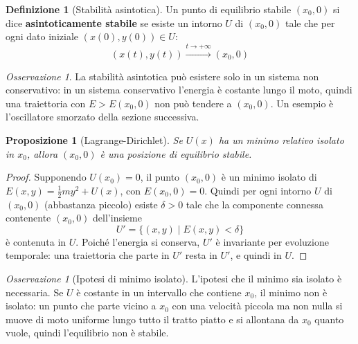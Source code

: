 \documentclass[11pt, a4paper, openright]{book}
\theoremstyle{plain}
\newtheorem{proposizione}[teorema]{Proposizione}
\theoremstyle{definition}
\newtheorem{definizione}[teorema]{Definizione}
\theoremstyle{remark}
\newtheorem{osservazione}[teorema]{Osservazione}
\begin{document}
\begin{definizione}[Stabilità asintotica]
    Un punto di equilibrio stabile $(x_0, 0)$ si dice \textbf{asintoticamente stabile} se esiste un intorno $U$ di $(x_0, 0)$ tale che per ogni dato iniziale $(x(0), y(0)) \in U$:
    \begin{equation}
        (x(t), y(t)) \xrightarrow{t \to +\infty} (x_0, 0)
    \end{equation}
\end{definizione}

\begin{osservazione}
    La stabilità asintotica può esistere solo in un sistema non conservativo: in un sistema conservativo l'energia è costante lungo il moto, quindi una traiettoria con $E > E(x_0, 0)$ non può tendere a $(x_0, 0)$. Un esempio è l'oscillatore smorzato della sezione successiva.
\end{osservazione}

\begin{proposizione}[Lagrange-Dirichlet]
    Se $U(x)$ ha un minimo relativo isolato in $x_0$, allora $(x_0, 0)$ è una posizione di equilibrio stabile.
\end{proposizione}
\begin{proof}
    Supponendo $U(x_0) = 0$, il punto $(x_0, 0)$ è un minimo isolato di $E(x, y) = \frac{1}{2}m y^2 + U(x)$, con $E(x_0, 0) = 0$. Quindi per ogni intorno $U$ di $(x_0, 0)$ (abbastanza piccolo) esiste $\delta > 0$ tale che la componente connessa contenente $(x_0, 0)$ dell'insieme
    \begin{equation}
        U' = \{(x, y) \mid E(x, y) < \delta\}
    \end{equation}
    è contenuta in $U$. Poiché l'energia si conserva, $U'$ è invariante per evoluzione temporale: una traiettoria che parte in $U'$ resta in $U'$, e quindi in $U$.
\end{proof}

\begin{osservazione}[Ipotesi di minimo isolato]
    L'ipotesi che il minimo sia isolato è necessaria. Se $U$ è costante in un intervallo che contiene $x_0$, il minimo non è isolato: un punto che parte vicino a $x_0$ con una velocità piccola ma non nulla si muove di moto uniforme lungo tutto il tratto piatto e si allontana da $x_0$ quanto vuole, quindi l'equilibrio non è stabile.
\end{osservazione}
\end{document}
